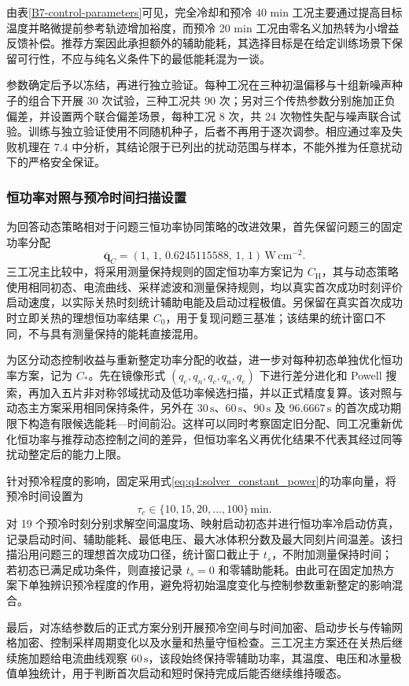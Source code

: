 由表\ref{B7-control-parameters}可见，完全冷却和预冷 40 min 工况主要通过提高目标温度并略微提前参考轨迹增加裕度，而预冷 20 min 工况由零名义加热转为小增益反馈补偿。推荐方案因此承担额外的辅助能耗，其选择目标是在给定训练场景下保留可行性，不应与纯名义条件下的最低能耗混为一谈。

参数确定后予以冻结，再进行独立验证。每种工况在三种初温偏移与十组新噪声种子的组合下开展 30 次试验，三种工况共 90 次；另对三个传热参数分别施加正负偏差，并设置两个联合偏差场景，每种工况 8 次，共 24 次物性失配与噪声联合试验。训练与独立验证使用不同随机种子，后者不再用于逐次调参。相应通过率及失败机理在 7.4 中分析，其结论限于已列出的扰动范围与样本，不能外推为任意扰动下的严格安全保证。

\subsubsection{恒功率对照与预冷时间扫描设置}
为回答动态策略相对于问题三恒功率协同策略的改进效果，首先保留问题三的固定功率分配
\begin{equation}
\overline{\boldsymbol q}_{C}=
(1,\,1,\,0.6245115588,\,1,\,1)\,\mathrm{W\,cm^{-2}}.
\tag{7-@@9@@}\label{eq:q4:solver_constant_power}
\end{equation}
三工况主比较中，将采用测量保持规则的固定恒功率方案记为 \(C_{\mathrm H}\)，其与动态策略使用相同初态、电流曲线、采样滤波和测量保持规则，均以真实首次成功时刻评价启动速度，以实际关热时刻统计辅助电能及启动过程极值。另保留在真实首次成功时立即关热的理想恒功率结果 \(C_0\)，用于复现问题三基准；该结果的统计窗口不同，不与具有测量保持的能耗直接混用。

为区分动态控制收益与重新整定功率分配的收益，进一步对每种初态单独优化恒功率方案，记为 \(C_*\)。先在镜像形式 \((q_e,q_n,q_c,q_n,q_e)\) 下进行差分进化和 Powell 搜索，再加入五片非对称邻域扰动及低功率候选扫描，并以正式精度复算。该对照与动态主方案采用相同保持条件，另外在 \(30\,\mathrm s\)、\(60\,\mathrm s\)、\(90\,\mathrm s\) 及 \(96.6667\,\mathrm s\) 的首次成功期限下构造有限候选能耗—时间前沿。这样可以同时考察固定旧分配、同工况重新优化恒功率与推荐动态控制之间的差异，但恒功率名义再优化结果不代表其经过同等扰动整定后的能力上限。

针对预冷程度的影响，固定采用式\eqref{eq:q4:solver_constant_power}的功率向量，将预冷时间设置为
\begin{equation}
\tau_c\in\{10,15,20,\ldots,100\}\,\mathrm{min}.
\tag{7-@@10@@}\label{eq:q4:solver_cooling_scan}
\end{equation}
对 19 个预冷时刻分别求解空间温度场、映射启动初态并进行恒功率冷启动仿真，记录启动时间、辅助能耗、最低电压、最大冰体积分数及最大同刻片间温差。该扫描沿用问题三的理想首次成功口径，统计窗口截止于 \(t_s\)，不附加测量保持时间；若初态已满足成功条件，则直接记录 \(t_s=0\) 和零辅助能耗。由此可在固定加热方案下单独辨识预冷程度的作用，避免将初始温度变化与控制参数重新整定的影响混合。

最后，对冻结参数后的正式方案分别开展预冷空间与时间加密、启动步长与传输网格加密、控制采样周期变化以及水量和热量守恒检查。三工况主方案还在关热后继续施加题给电流曲线观察 \(60\,\mathrm s\)，该段始终保持零辅助功率，其温度、电压和冰量极值单独统计，用于判断首次启动和短时保持完成后能否继续维持暖态。
